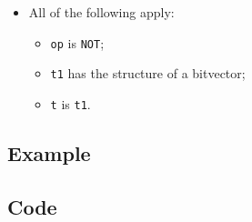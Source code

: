 \documentclass{book}
\begin{document}
\begin{itemize}
    \item All of the following apply:
    \begin{itemize}
      \item \texttt{op} is \texttt{NOT};
      \item \texttt{t1} has the structure of a bitvector;
      \item \texttt{t} is \texttt{t1}.
    \end{itemize}
  \end{itemize}

  \subsection{Example}

  \subsection{Code}
\end{document}
